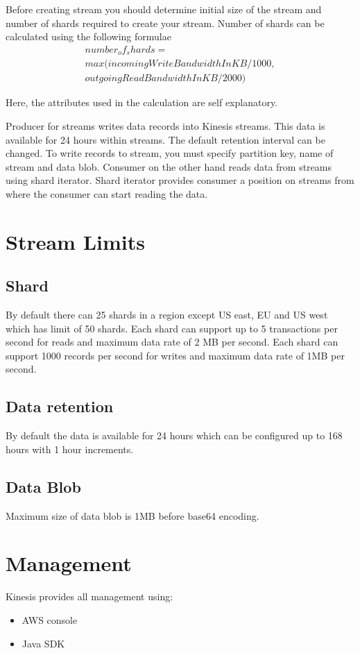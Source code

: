 \documentclass[9pt,twocolumn,twoside]{styles/osajnl}
\begin{document}
Before creating stream you should determine initial size of the stream \cite{www-kinesis-size} and number of shards required to create your stream. Number of shards can be calculated using the following formulae
\begin{multline*} 
number_of_shards = \\
   max ( 
   incomingWriteBandwidthInKB/1000, \\
   outgoingReadBandwidthInKB/2000
   )
\end{multline*}

Here, the attributes used in the calculation are self explanatory.

Producer for streams writes data records into Kinesis streams. This data is available for 24 hours within streams. The default retention interval can be changed. To write records to stream, you must specify partition key, name of stream and data blob. Consumer on the other hand reads data from streams using shard iterator. Shard iterator provides consumer a position on streams from where the consumer can start reading the data.

\section{Stream Limits}
\subsection{Shard}
By default there can 25 shards in a region except US east, EU and US west which has limit of 50 shards. Each shard can support up to 5 transactions per second for reads and maximum data rate of 2 MB per second. Each shard can support 1000 records per second for writes and maximum data rate of 1MB per second.

\subsection{Data retention}
By default the data is available for 24 hours which can be configured up to 168 hours with 1 hour increments.

\subsection{Data Blob}
Maximum size of data blob is 1MB before base64 encoding.

\section{Management}
Kinesis provides all management using:
\begin{itemize}
	\item  AWS console
	\item Java SDK \cite{www-kinesis-javasdk} 
\end{itemize}
\end{document}
